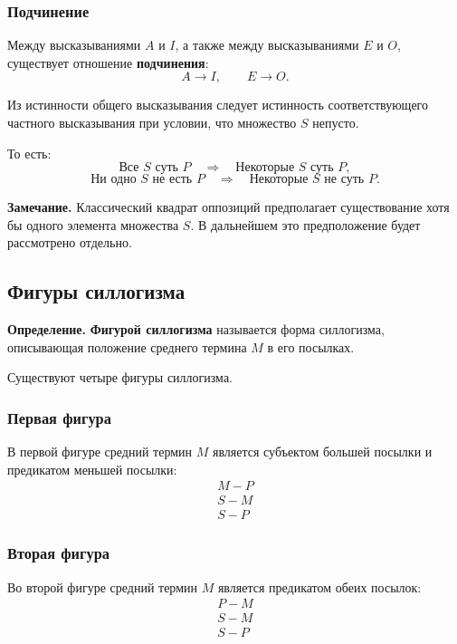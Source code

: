 \documentclass[12pt,a4paper,oneside,openany]{book}
\theoremstyle{definition}
\theoremstyle{plain}
\theoremstyle{remark}
\begin{document}
\subsubsection{Подчинение}

Между высказываниями \(A\) и \(I\), а также между высказываниями
\(E\) и \(O\), существует отношение \textbf{подчинения}:
\[
A\longrightarrow I,
\qquad
E\longrightarrow O.
\]

Из истинности общего высказывания следует истинность
соответствующего частного высказывания при условии, что множество
\(S\) непусто.

То есть:
\[
\text{Все }S\text{ суть }P
\quad\Longrightarrow\quad
\text{Некоторые }S\text{ суть }P,
\]
\[
\text{Ни одно }S\text{ не есть }P
\quad\Longrightarrow\quad
\text{Некоторые }S\text{ не суть }P.
\]

\textbf{Замечание.}
Классический квадрат оппозиций предполагает существование хотя бы
одного элемента множества \(S\). В дальнейшем это предположение
будет рассмотрено отдельно.

\subsection{Фигуры силлогизма}

\textbf{Определение.}
\textbf{Фигурой силлогизма} называется форма силлогизма,
описывающая положение среднего термина \(M\) в его посылках.

Существуют четыре фигуры силлогизма.

\subsubsection{Первая фигура}

В первой фигуре средний термин \(M\) является субъектом большей
посылки и предикатом меньшей посылки:
\[
\boxed{
\begin{array}{c}
M-P\\
S-M\\
\hline
S-P
\end{array}
}
\]

\subsubsection{Вторая фигура}

Во второй фигуре средний термин \(M\) является предикатом обеих
посылок:
\[
\boxed{
\begin{array}{c}
P-M\\
S-M\\
\hline
S-P
\end{array}
}
\]
\end{document}

